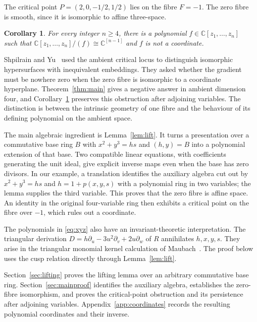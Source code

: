 \documentclass[11pt]{article}
\numberwithin{equation}{section}
\newtheorem{corollary}[theorem]{Corollary}
\newcommand{\CC}{\mathbb C}
\begin{document}
The critical point $P=(2,0,-1/2,1/2)$ lies on the fibre $F=-1$.
The zero fibre is smooth, since it is isomorphic to affine three-space.

\begin{corollary}\label{cor:dimension}
For every integer $n\ge4$, there is a polynomial
$f\in\CC[z_1,\ldots,z_n]$ such that
$\CC[z_1,\ldots,z_n]/(f)\cong\CC^{[n-1]}$ and $f$ is not a coordinate.
\end{corollary}

Shpilrain and Yu~\cite[\S1]{SY} used the ambient critical locus to distinguish
isomorphic hypersurfaces with inequivalent embeddings. They asked whether the
gradient must be nowhere zero when the zero fibre is isomorphic to a coordinate
hyperplane. Theorem~\ref{thm:main} gives a negative answer in ambient dimension
four, and Corollary~\ref{cor:dimension} preserves this obstruction after adjoining
variables. The distinction is between the intrinsic geometry of one fibre and
the behaviour of its defining polynomial on the ambient space.

The main algebraic ingredient is Lemma~\ref{lem:lift}. It turns a presentation
over a commutative base ring $B$ with $x^2+y^3=hs$ and $(h,y)=B$ into a polynomial
extension of that base. Two compatible linear equations, with coefficients
generating the unit ideal, give explicit inverse maps even when the base has
zero divisors. In our example, a translation identifies the auxiliary algebra
cut out by $x^2+y^3=hs$ and $h=1+p(x,y,s)$ with a polynomial ring in two
variables; the lemma supplies the third variable. This proves that the zero
fibre is affine space. An identity in the original four-variable ring then
exhibits a critical point on the fibre over $-1$, which rules out a coordinate.

The polynomials in \eqref{eq:xyz} also have an invariant-theoretic
interpretation. The triangular derivation
$D=h\partial_u-3u^2\partial_v+2u\partial_w$ of $R$ annihilates $h,x,y,s$.
They arise in the triangular monomial kernel calculation of
Maubach~\cite[proof of Theorem~3.2, case~(3)]{MaubachMonomial}.
The proof below uses the cusp relation directly through Lemma~\ref{lem:lift}.

Section~\ref{sec:lifting} proves the lifting lemma over an arbitrary commutative
base ring. Section~\ref{sec:mainproof} identifies the auxiliary algebra,
establishes the zero-fibre isomorphism, and proves the critical-point obstruction
and its persistence after adjoining variables. Appendix~\ref{app:coordinates}
records the resulting polynomial coordinates and their inverse.
\end{document}
